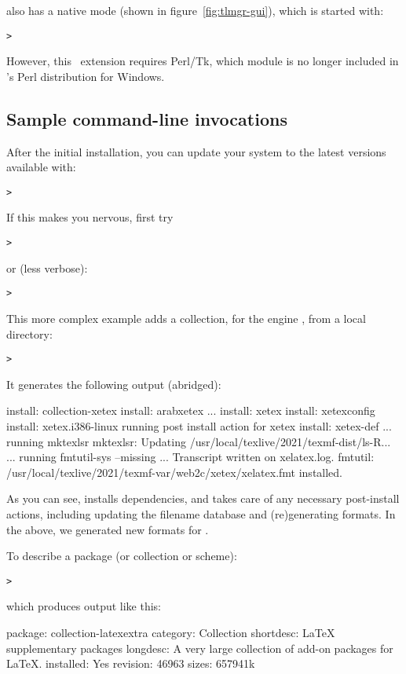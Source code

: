 \documentclass{article}
\begin{document}
 also has a native \GUI{} mode (shown in
figure~\ref{fig:tlmgr-gui}), which is started with:
\begin{alltt}
> 
\end{alltt}
However, this \GUI\ extension requires Perl/Tk, which module is no
longer included in \TL's Perl distribution for Windows.

\subsection{Sample  command-line invocations}

After the initial installation, you can update your system to the latest
versions available with:
\begin{alltt}
> 
\end{alltt}
If this makes you nervous, first try
\begin{alltt}
> 
\end{alltt}
or (less verbose):
\begin{alltt}
> 
\end{alltt}

This more complex example adds a collection, for the engine \XeTeX, from
a local directory:

\begin{alltt}
> 
\end{alltt}
It generates the following output (abridged):
\begin{fverbatim}
install: collection-xetex
install: arabxetex
...
install: xetex
install: xetexconfig
install: xetex.i386-linux
running post install action for xetex
install: xetex-def
...
running mktexlsr
mktexlsr: Updating /usr/local/texlive/2021/texmf-dist/ls-R...
...
running fmtutil-sys --missing
...
Transcript written on xelatex.log.
fmtutil: /usr/local/texlive/2021/texmf-var/web2c/xetex/xelatex.fmt installed.
\end{fverbatim}

As you can see,  installs dependencies, and takes care of any
necessary post-install actions, including updating the filename database
and (re)generating formats.  In the above, we generated new formats for
\XeTeX.

To describe a package (or collection or scheme):
\begin{alltt}
> 
\end{alltt}
which produces output like this:
\begin{fverbatim}
package:    collection-latexextra
category:   Collection
shortdesc:  LaTeX supplementary packages
longdesc:   A very large collection of add-on packages for LaTeX.
installed:  Yes
revision:   46963
sizes:      657941k
\end{fverbatim}
\end{document}
